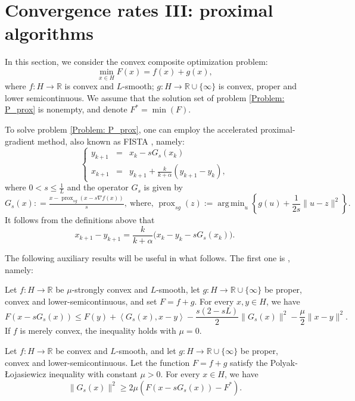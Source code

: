 \documentclass[onefignum,onetabnum]{siamart220329}
\DeclareMathOperator*{\argmin}{arg\,min}
\DeclareMathOperator{\prox}{prox}
\begin{document}
\section{Convergence rates III: proximal algorithms}\label{Sec: proximal_algorithms}
In this section, we consider the convex composite optimization problem:
\begin{equation}\label{Problem: P_prox}
\min_{x\in H} F(x) = f(x) + g(x),
\end{equation}
where $f:H\to\mathbb{R}$ is convex and $L$-smooth; $g:H\to\mathbb{R}\cup\{\infty\}$ is convex, proper and lower semicontinuous. We assume that the solution set of problem \eqref{Problem: P_prox} is nonempty, and denote $F^* = \min(F)$.

To solve problem \eqref{Problem: P_prox}, one can employ the accelerated proximal-gradient method, also known as FISTA \cite{Beck_2009}, namely:
\begin{equation}\label{Algo: APM}\tag{APM}
\left\{
\begin{array}{rcl}
y_{k+1} &=& x_k - sG_s(x_k) \\
x_{k+1} &=& y_{k+1} + \frac{k}{k+\alpha}( y_{k+1} - y_k ),
\end{array}
\right.
\end{equation}
where $0< s \le \frac{1}{L}$ and the operator $G_s$ is given by
$$G_s(x): = \tfrac{x-\prox_{sg}(x-s\nabla f(x))}{s},\ \text{where, } \prox_{sg}(z) := \argmin_{u}\left\{ g(u) + \frac{1}{2s}\| u - z \|^2  \right\}.  $$
It follows from the definitions above that 
\begin{equation}\label{E: iterates_prox}
x_{k+1} - y_{k+1} = \frac{k}{k+\alpha}\big(x_k - y_k - sG_s(x_k)\big).
\end{equation}


The following auxiliary results will be useful in what follows. The first one is \cite[Lemma 7]{Bao_2023}, namely:

\begin{lemma}\label{Lem: prox_bound_SC}
Let $f:H\to\mathbb{R}$ be $\mu$-strongly convex and $L$-smooth, let $g:H\to\mathbb{R}\cup\{\infty\}$ be proper, convex and lower-semicontinuous, and set $F=f+g$. For every $x,y\in H$, we have
$$F\left(x-sG_s(x)\right) \le F(y) + \left\langle G_s(x), x-y \right\rangle - \frac{s(2-sL)}{2} \| G_s(x) \|^2 - \frac{\mu}{2}\| x-y \|^2.$$
If $f$ is merely convex, the inequality holds with $\mu=0$.
\end{lemma}


\begin{lemma} \label{L:PL_prox}
Let $f:H\to\mathbb{R}$ be convex and $L$-smooth, and let $g:H\to\mathbb{R}\cup\{\infty\}$ be proper, convex and lower-semicontinuous. Let the function $F=f+g$ satisfy the Polyak-\L ojasiewicz inequality with constant $\mu>0$. For every $x\in H$, we have
$$ \| G_s(x) \|^2 \ge 2\mu \left( F\left(x-sG_s(x)\right) - F^* \right). $$ 
\end{lemma}
\end{document}
